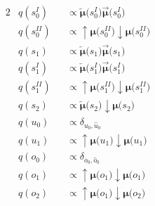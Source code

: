 \documentclass[fleqn]{article}
\begin{document}
\begin{minipage}[t]{0.5\textwidth}
\begin{alignat}{2}
         & q(s^{\scriptscriptstyle I}_0)                             &  & \propto \bm{\overleftarrow{\mu}(}s^{\scriptscriptstyle I}_0\bm{)} \bm{\overrightarrow{\mu}(}s^{\scriptscriptstyle I}_0\bm{)}     \\
         & q(s^{\scriptscriptstyle II}_0)                            &  & \propto \bm{{\uparrow}{\mu}(}s^{\scriptscriptstyle II}_0\bm{)} \bm{{\downarrow}{\mu}(}s^{\scriptscriptstyle II}_0\bm{)}          \\
         & q(s_1)                                                    &  & \propto \bm{\overleftarrow{\mu}(}s_1\bm{)} \bm{\overrightarrow{\mu}(}s_1\bm{)}                                                   \\
         & q(s^{\scriptscriptstyle I}_1)                             &  & \propto \bm{\overleftarrow{\mu}(}s^{\scriptscriptstyle I}_1\bm{)} \bm{\overrightarrow{\mu}(}s^{\scriptscriptstyle I}_1\bm{)}     \\
         & q(s^{\scriptscriptstyle II}_1)                            &  & \propto \bm{{\uparrow}{\mu}(}s^{\scriptscriptstyle II}_1\bm{)} \bm{{\downarrow}{\mu}(}s^{\scriptscriptstyle II}_1\bm{)}          \\
         & q(s_2)                                                    &  & \propto \bm{\overleftarrow{\mu}(}s_2\bm{)} \bm{{\downarrow}{\mu}(}s_2\bm{)}                                                      \\
         & q(u_0)                                                    &  & \propto \delta_{u_0,\hat{u}_0}                                                                                                   \\
         & q(u_1)                                                    &  & \propto \bm{{\uparrow}{\mu}(}u_1\bm{)} \bm{{\downarrow}{\mu}(}u_1\bm{)}                                                          \\
         & q(o_0)                                                    &  & \propto \delta_{o_0,\hat{o}_0}                                                                                                   \\
         & q(o_1)                                                    &  & \propto \bm{{\uparrow}{\mu}(}o_1\bm{)} \bm{{\downarrow}{\mu}(}o_1\bm{)}                                                          \\
         & q(o_2)                                                    &  & \propto \bm{{\uparrow}{\mu}(}o_1\bm{)} \bm{{\downarrow}{\mu}(}o_2\bm{)}
    \end{alignat}
\end{minipage}
\end{document}
